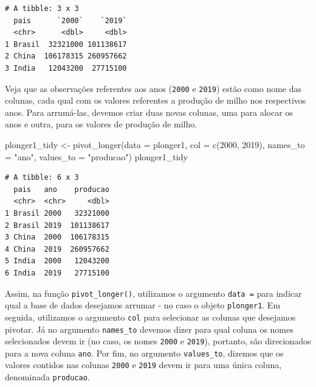 \documentclass[
  brazilian,
]{book}
\newenvironment{Shaded}{\begin{snugshade}}{\end{snugshade}}
\newcommand{\AttributeTok}[1]{\textcolor[rgb]{0.77,0.63,0.00}{#1}}
\newcommand{\FunctionTok}[1]{\textcolor[rgb]{0.00,0.00,0.00}{#1}}
\newcommand{\NormalTok}[1]{#1}
\newcommand{\OtherTok}[1]{\textcolor[rgb]{0.56,0.35,0.01}{#1}}
\newcommand{\StringTok}[1]{\textcolor[rgb]{0.31,0.60,0.02}{#1}}
\begin{document}
\begin{verbatim}
# A tibble: 3 x 3
  pais      `2000`    `2019`
  <chr>      <dbl>     <dbl>
1 Brasil  32321000 101138617
2 China  106178315 260957662
3 India   12043200  27715100
\end{verbatim}

Veja que as observações referentes aos anos (\texttt{2000} e \texttt{2019}) estão como nome das colunas, cada qual com os valores referentes a produção de milho nos respectivos anos. Para arrumá-las, devemos criar duas novas colunas, uma para alocar os anos e outra, para os valores de produção de milho.

\begin{Shaded}
\begin{Highlighting}[]
\NormalTok{plonger1\_tidy }\OtherTok{\textless{}{-}} \FunctionTok{pivot\_longer}\NormalTok{(}\AttributeTok{data =}\NormalTok{ plonger1,}
                              \AttributeTok{col =} \FunctionTok{c}\NormalTok{(}\StringTok{\textasciigrave{}}\AttributeTok{2000}\StringTok{\textasciigrave{}}\NormalTok{, }\StringTok{\textasciigrave{}}\AttributeTok{2019}\StringTok{\textasciigrave{}}\NormalTok{),}
                              \AttributeTok{names\_to =} \StringTok{"ano"}\NormalTok{, }
                              \AttributeTok{values\_to =} \StringTok{"producao"}\NormalTok{)}
\NormalTok{plonger1\_tidy}
\end{Highlighting}
\end{Shaded}

\begin{verbatim}
# A tibble: 6 x 3
  pais   ano    producao
  <chr>  <chr>     <dbl>
1 Brasil 2000   32321000
2 Brasil 2019  101138617
3 China  2000  106178315
4 China  2019  260957662
5 India  2000   12043200
6 India  2019   27715100
\end{verbatim}

Assim, na função \texttt{pivot\_longer()}, utilizamos o argumento \texttt{data\ =} para indicar qual a base de dados desejamos arrumar - no caso o objeto \texttt{plonger1}. Em seguida, utilizamos o argumento \texttt{col} para selecionar as colunas que desejamos pivotar. Já no argumento \texttt{names\_to} devemos dizer para qual coluna os nomes selecionados devem ir (no caso, os nomes \texttt{2000} e \texttt{2019}), portanto, são direcionados para a nova coluna \texttt{ano}. Por fim, no argumento \texttt{values\_to}, dizemos que os valores contidos nas colunas \texttt{2000} e \texttt{2019} devem ir para uma única coluna, denominada \texttt{producao}.
\end{document}
